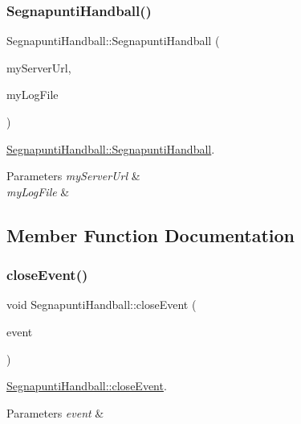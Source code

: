 \subsubsection{\texorpdfstring{Segnapunti\+Handball()}{SegnapuntiHandball()}}
{\footnotesize\ttfamily Segnapunti\+Handball\+::\+Segnapunti\+Handball (\begin{DoxyParamCaption}\item[{const Q\+String \&}]{my\+Server\+Url,  }\item[{Q\+File $\ast$}]{my\+Log\+File }\end{DoxyParamCaption})}



\mbox{\hyperlink{classSegnapuntiHandball_a0581dd7d17d9a2d4acef3ec91e6009a6}{Segnapunti\+Handball\+::\+Segnapunti\+Handball}}. 


\begin{DoxyParams}{Parameters}
{\em my\+Server\+Url} & \\
\hline
{\em my\+Log\+File} & \\
\hline
\end{DoxyParams}


\subsection{Member Function Documentation}
\mbox{\label{classSegnapuntiHandball_a1200027eefb42a1e69edaad2349190d4}} 
\subsubsection{\texorpdfstring{close\+Event()}{closeEvent()}}
{\footnotesize\ttfamily void Segnapunti\+Handball\+::close\+Event (\begin{DoxyParamCaption}\item[{Q\+Close\+Event $\ast$}]{event }\end{DoxyParamCaption})}



\mbox{\hyperlink{classSegnapuntiHandball_a1200027eefb42a1e69edaad2349190d4}{Segnapunti\+Handball\+::close\+Event}}. 


\begin{DoxyParams}{Parameters}
{\em event} & \\
\hline
\end{DoxyParams}
\mbox{\label{classSegnapuntiHandball_a9ec2eff0a86fe7fad3b03a0f013af603}} 
